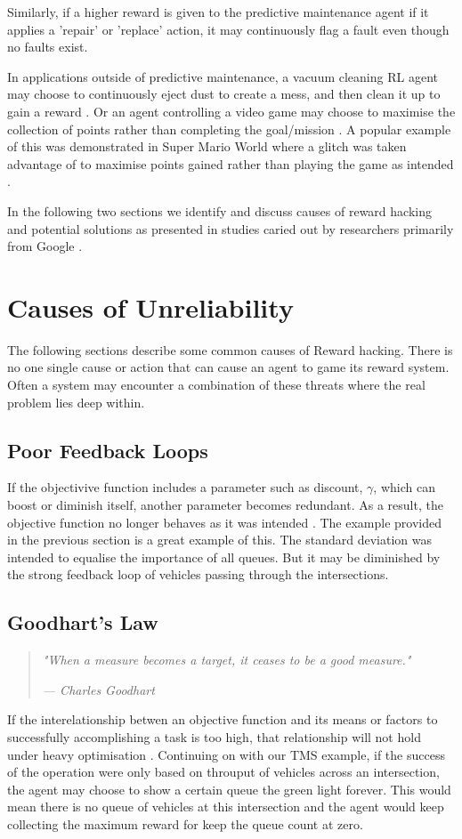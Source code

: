 Similarly, if a higher reward is given to the predictive maintenance agent if it applies a 'repair' or 'replace' action, it may continuously flag a fault even though no faults exist. 

In applications outside of predictive maintenance, a vacuum cleaning RL agent may choose to continuously eject dust to create a mess, and then clean it up to gain a reward \cite{inverse-reward}.
Or an agent controlling a video game may choose to maximise the collection of points rather than completing the goal/mission \cite{inverse-reward}. 
A popular example of this was demonstrated in Super Mario World where a glitch was taken advantage of to maximise points gained rather than playing the game as intended \cite{mario}.

In the following two sections we identify and discuss causes of reward hacking and potential solutions as presented in studies caried out by researchers primarily from Google \cite{Amodei} \cite{DBLP:journals/corr/abs-1908-04734}.

\section{Causes of Unreliability}
\label{sec:causes}
The following sections describe some common causes of Reward hacking.
There is no one single cause or action that can cause an agent to game its reward system. 
Often a system may encounter a combination of these threats where the real problem lies deep within.

\subsection{Poor Feedback Loops}
If the objectivive function includes a parameter such as discount, $\gamma$, which can boost or diminish itself, another parameter becomes redundant.
As a result, the objective function no longer behaves as it was intended \cite{Amodei}.
The example provided in the previous section is a great example of this. The standard deviation was intended to equalise the importance of all queues.
But it may be diminished by the strong feedback loop of vehicles passing through the intersections.

\subsection{Goodhart's Law}
\begin{quotation}
    \textit{"When a measure becomes a target, it ceases to be a good measure."}
    \par \raggedleft\textit{--- Charles Goodhart}
\end{quotation}
If the interelationship betwen an objective function and its means or factors to successfully accomplishing a task is too high,
that relationship will not hold under heavy optimisation \cite{Amodei}. 
Continuing on with our TMS example, if the success of the operation were only based on throuput of vehicles across an intersection,
the agent may choose to show a certain queue the green light forever. 
This would mean there is no queue of vehicles at this intersection and the agent would keep collecting the maximum reward for keep the queue count at zero.

